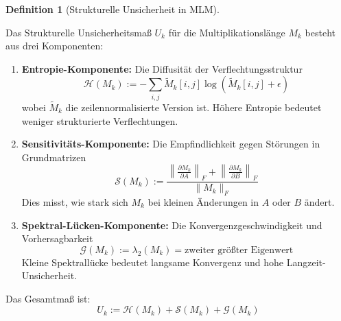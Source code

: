 \documentclass[a4paper,12pt]{article}
\theoremstyle{definition}
\newtheorem{definition}{Definition}
\begin{document}
\begin{definition}[Strukturelle Unsicherheit in MLM]
\label{def:mlm_unsicherheit}

Das Strukturelle Unsicherheitsmaß $U_k$ für die Multiplikationslänge $M_k$ besteht aus drei Komponenten:

\begin{enumerate}
\item \textbf{Entropie-Komponente:} Die Diffusität der Verflechtungsstruktur
\[
\mathcal{H}(M_k) := -\sum_{i,j} \tilde{M}_k[i,j] \log(\tilde{M}_k[i,j] + \epsilon)
\]
wobei $\tilde{M}_k$ die zeilennormalisierte Version ist. Höhere Entropie bedeutet weniger strukturierte Verflechtungen.

\item \textbf{Sensitivitäts-Komponente:} Die Empfindlichkeit gegen Störungen in Grundmatrizen
\[
\mathcal{S}(M_k) := \frac{\left\|\frac{\partial M_k}{\partial A}\right\|_F + \left\|\frac{\partial M_k}{\partial B}\right\|_F}{\|M_k\|_F}
\]
Dies misst, wie stark sich $M_k$ bei kleinen Änderungen in $A$ oder $B$ ändert.

\item \textbf{Spektral-Lücken-Komponente:} Die Konvergenzgeschwindigkeit und Vorhersagbarkeit
\[
\mathcal{G}(M_k) := \lambda_2(M_k) = \text{zweiter größter Eigenwert}
\]
Kleine Spektrallücke bedeutet langsame Konvergenz und hohe Langzeit-Unsicherheit.
\end{enumerate}

Das Gesamtmaß ist:
\[
U_k := \mathcal{H}(M_k) + \mathcal{S}(M_k) + \mathcal{G}(M_k)
\]
\end{definition}
\end{document}
